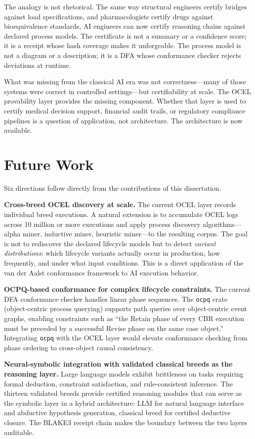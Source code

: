 The analogy is not rhetorical. The same way structural engineers certify bridges against load specifications, and pharmacologists certify drugs against bioequivalence standards, AI engineers can now certify reasoning chains against declared process models. The certificate is not a summary or a confidence score; it is a receipt whose hash coverage makes it unforgeable. The process model is not a diagram or a description; it is a DFA whose conformance checker rejects deviations at runtime.

What was missing from the classical AI era was not correctness---many of those systems were correct in controlled settings---but certifiability at scale. The OCEL provability layer provides the missing component. Whether that layer is used to certify medical decision support, financial audit trails, or regulatory compliance pipelines is a question of application, not architecture. The architecture is now available.

\section{Future Work}
\label{sec:future-work}

Six directions follow directly from the contributions of this dissertation.

\textbf{Cross-breed OCEL discovery at scale.} The current OCEL layer records individual breed executions. A natural extension is to accumulate OCEL logs across 10 million or more executions and apply process discovery algorithms---alpha miner, inductive miner, heuristic miner---to the resulting corpus. The goal is not to rediscover the declared lifecycle models but to detect \emph{variant distributions}: which lifecycle variants actually occur in production, how frequently, and under what input conditions. This is a direct application of the van der Aalst conformance framework to AI execution behavior.

\textbf{OCPQ-based conformance for complex lifecycle constraints.} The current DFA conformance checker handles linear phase sequences. The \texttt{ocpq} crate (object-centric process querying) supports path queries over object-centric event graphs, enabling constraints such as ``the Retain phase of every CBR execution must be preceded by a successful Revise phase on the same case object.'' Integrating \texttt{ocpq} with the OCEL layer would elevate conformance checking from phase ordering to cross-object causal consistency.

\textbf{Neural-symbolic integration with validated classical breeds as the reasoning layer.} Large language models exhibit brittleness on tasks requiring formal deduction, constraint satisfaction, and rule-consistent inference. The thirteen validated breeds provide certified reasoning modules that can serve as the symbolic layer in a hybrid architecture: LLM for natural language interface and abductive hypothesis generation, classical breed for certified deductive closure. The BLAKE3 receipt chain makes the boundary between the two layers auditable.

